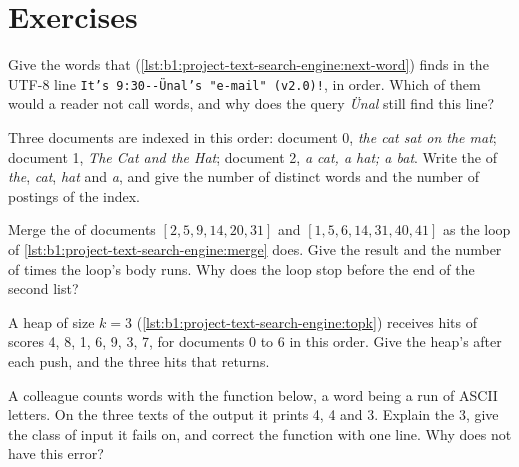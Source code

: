 \section{Exercises}\label{sec:b1:project-text-search-engine:exercises}

\begin{exercise}[$\star$]\label{exo:b1:project-text-search-engine:1}
Give the words that  (\cref{lst:b1:project-text-search-engine:next-word}) finds in the UTF-8 line
\texttt{It's 9:30-{}-{}Ünal's "e-{}mail" (v2.0)!}, in order. Which of them would a reader not call words, and why does
the query \emph{Ünal} still find this line?
\end{exercise}

\begin{exercise}[$\star$]\label{exo:b1:project-text-search-engine:2}
Three documents are indexed in this order: document 0, \emph{the cat sat on the mat}; document 1, \emph{The Cat and
the Hat}; document 2, \emph{a cat, a hat; a bat}. Write the  of \emph{the}, \emph{cat}, \emph{hat} and
\emph{a}, and give the number of distinct words and the number of postings of the index.
\end{exercise}

\begin{exercise}[$\star$]\label{exo:b1:project-text-search-engine:3}
Merge the  of documents $[2, 5, 9, 14, 20, 31]$ and $[1, 5, 6, 14, 31, 40, 41]$ as the loop of
\cref{lst:b1:project-text-search-engine:merge} does. Give the result and the number of times the loop's body runs.
Why does the loop stop before the end of the second list?
\end{exercise}

\begin{exercise}[$\star$]\label{exo:b1:project-text-search-engine:4}
A heap of size $k = 3$ (\cref{lst:b1:project-text-search-engine:topk}) receives hits of scores 4, 8, 1, 6, 9, 3, 7, for
documents 0 to 6 in this order. Give the heap's  after each push, and the three hits that 
returns.
\end{exercise}

\begin{exercise}[$\star\star$]\label{exo:b1:project-text-search-engine:5}
A colleague counts words with the function below, a word being a run of ASCII letters. On the three texts of the
output it prints 4, 4 and 3. Explain the 3, give the class of input it fails on, and correct the function with one
line. Why does  not have this error?

\end{exercise}

